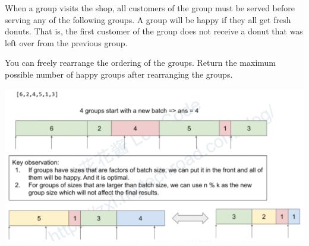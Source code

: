 \documentclass[9pt, b5paper]{article}
\begin{document}
When a group visits the shop, all customers of the group must be served before serving any of the following groups. A group will be happy if they all get fresh donuts. That is, the first customer of the group does not receive a donut that was left over from the previous group.

You can freely rearrange the ordering of the groups. Return the maximum possible number of happy groups after rearranging the groups.

\includegraphics[width=.9\linewidth]{./pic/donut.png}
\end{document}
